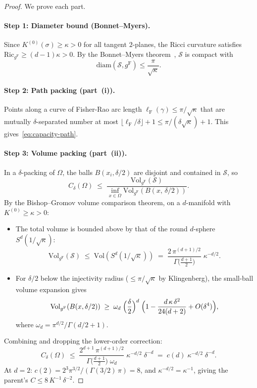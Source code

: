 \documentclass[11pt]{article}
\newcommand{\gF}{g^{\mathrm{F}}}
\theoremstyle{remark}
\begin{document}
\begin{proof}
We prove each part.

\paragraph{Step 1: Diameter bound (Bonnet--Myers).}
Since $K^{(0)}(\sigma) \ge \kappa > 0$ for all tangent $2$-planes,
the Ricci curvature satisfies
$\mathrm{Ric}_{\gF} \ge (d{-}1)\kappa > 0$.
By the Bonnet--Myers theorem~\cite{bonnet1855, myers1941},
$\mathcal{S}$ is compact with
\begin{equation}\label{eq:bonnet-myers}
\mathrm{diam}(\mathcal{S}, \gF) \le \frac{\pi}{\sqrt{\kappa}}.
\end{equation}

\paragraph{Step 2: Path packing (part~(i)).}
Points along a curve of Fisher-Rao arc length
$\ell_{\mathrm{F}}(\gamma) \le \pi/\sqrt\kappa$ that are mutually
$\delta$-separated number at most
$\lfloor \ell_{\mathrm{F}} / \delta \rfloor + 1
\le \pi/(\delta\sqrt\kappa) + 1$.  This gives~\eqref{eq:capacity-path}.

\paragraph{Step 3: Volume packing (part~(ii)).}
In a $\delta$-packing of $\Omega$, the balls $B(x_i, \delta/2)$ are
disjoint and contained in $\mathcal{S}$, so
\[
C_\delta(\Omega)
\;\le\;
\frac{\mathrm{Vol}_{\gF}(\mathcal{S})}
     {\inf_{x \in \Omega}\mathrm{Vol}_{\gF}(B(x,\,\delta/2))}.
\]
By the Bishop--Gromov volume comparison theorem, on a $d$-manifold with
$K^{(0)} \ge \kappa > 0$:
\begin{itemize}[leftmargin=*]
\item The total volume is bounded above by that of the round
$d$-sphere $S^d(1/\sqrt\kappa)$:
\[
\mathrm{Vol}_{\gF}(\mathcal{S})
\;\le\;
\mathrm{Vol}(S^d(1/\sqrt\kappa))
\;=\;
\frac{2\,\pi^{(d+1)/2}}
     {\Gamma\!\bigl(\tfrac{d+1}{2}\bigr)}\;
\kappa^{-d/2}.
\]
\item For $\delta/2$ below the injectivity radius
($\le \pi/\sqrt\kappa$ by Klingenberg), the small-ball volume
expansion gives
\[
\mathrm{Vol}_{\gF}(B(x, \delta/2))
\;\ge\;
\omega_d\;\Bigl(\frac{\delta}{2}\Bigr)^d
\;\Bigl(1 - \frac{d\,\kappa\,\delta^2}{24(d+2)}
+ O(\delta^4)\Bigr),
\]
where $\omega_d = \pi^{d/2}/\Gamma(d/2+1)$.
\end{itemize}
Combining and dropping the lower-order correction:
\[
C_\delta(\Omega)
\;\le\;
\frac{2^{d+1}\,\pi^{(d+1)/2}}
     {\Gamma\!\bigl(\tfrac{d+1}{2}\bigr)\;\omega_d}
\;\kappa^{-d/2}\;\delta^{-d}
\;=\; c(d)\;\kappa^{-d/2}\;\delta^{-d}.
\]
At $d = 2$: $c(2) = 2^3 \pi^{3/2}/(\Gamma(3/2)\,\pi) = 8$, and
$\kappa^{-d/2} = \kappa^{-1}$, giving the parent's
$C \le 8\,K^{-1}\,\delta^{-2}$.


\end{proof}
\end{document}
